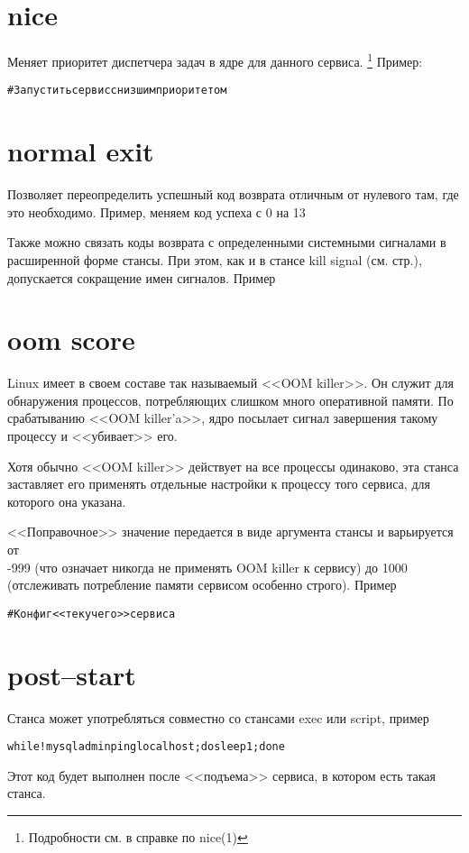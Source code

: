 \section{nice}
Меняет приоритет диспетчера задач в ядре для данного сервиса. \footnote{Подробности см. в справке по nice(1)}
Пример: \begin{alltt}
#Запустить сервис с низшим приоритетом
\end{alltt}
\section{normal exit}
Позволяет переопределить успешный код возврата отличным от нулевого там, где это необходимо. Пример, меняем код успеха с 0 на 13 \begin{alltt}
\end{alltt}
Также можно связать коды возврата с определенными системными сигналами в расширенной форме стансы. При этом, как и в стансе kill signal (см. стр.\pageref{sec:KillSignal}), допускается сокращение имен сигналов. Пример \begin{alltt}
\end{alltt}
\section{oom score}
Linux имеет в своем составе так называемый <<OOM killer>>. Он служит для обнаружения процессов, потребляющих слишком много оперативной памяти. По срабатыванию <<OOM killer'a>>, ядро посылает сигнал завершения такому процессу и <<убивает>> его. 

Хотя обычно <<OOM killer>> действует на все процессы одинаково, эта станса заставляет его применять отдельные настройки к процессу того сервиса, для которого она указана.

<<Поправочное>> значение передается в виде аргумента стансы и варьируется от \\-999 (что означает никогда не применять OOM killer к сервису) до 1000 (отслеживать потребление памяти сервисом особенно строго). Пример \begin{alltt}
#Конфиг <<текучего>> сервиса

\end{alltt}
\section{post--start} \label{sec:PostStart}
Станса может употребляться совместно со стансами exec или script, пример \begin{alltt}
while ! mysqladmin ping localhost ; do sleep 1 ; done
\end{alltt} Этот код будет выполнен после <<подъема>> сервиса, в котором есть такая станса.
